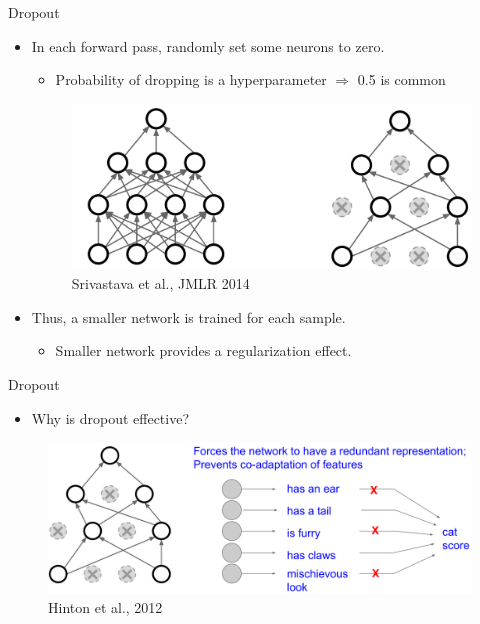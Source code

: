 \documentclass[serif, aspectratio=169]{beamer}
\begin{document}
\begin{frame}{Dropout}
	\begin{itemize}
		\item In each forward pass, randomly set some neurons to zero.
		\begin{itemize}
			\item Probability of dropping is a hyperparameter $\Rightarrow$ 0.5 is common
		\end{itemize}
		\begin{figure}[htpb]
			\begin{center}
				\includegraphics[keepaspectratio, scale=0.15]{pic/dropout}
				\caption*{\scriptsize Srivastava et al., JMLR 2014}
			\end{center}
		\end{figure}
		\vspace{-1em}
		\item Thus, a smaller network is trained for each sample.
		\begin{itemize}
			\item Smaller network provides a regularization effect.
		\end{itemize}
	\end{itemize}
\end{frame}

\begin{frame}{Dropout}
	\begin{itemize}
		\item Why is dropout effective?
	\end{itemize}
	\begin{figure}[htpb]
		\begin{center}
			\includegraphics[keepaspectratio, scale=0.15]{pic/dropout2}
			\caption*{\scriptsize Hinton et al., 2012}
		\end{center}
	\end{figure}
\end{frame}
\end{document}
